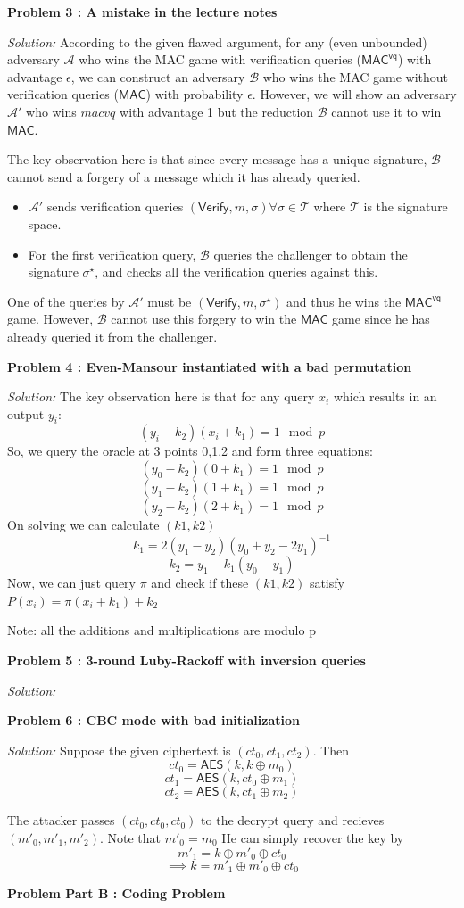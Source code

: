 \documentclass[a4paper, 11pt]{article}
\newenvironment{solution}
    {\textit{Solution:}}
    {\clearpage}
\newcommand{\prob}[1]{\begin{mdframed}[backgroundcolor=gray!20] \textbf{Problem #1}\end{mdframed}}
\newcommand{\verify}{\mathsf{Verify}}
\newcommand{\macvq}{\mathsf{MAC^{vq}}}
\newcommand{\mac}{\mathsf{MAC}}
\newcommand{\AES}{\mathsf{AES}}
\newcommand{\calA}{\mathcal{A}}
\newcommand{\calB}{\mathcal{B}}
\newcommand{\calT}{\mathcal{T}}
\begin{document}
\prob{3 : A mistake in the lecture notes}
\begin{solution}
    According to the given flawed argument, for any (even unbounded) adversary $\calA$ who wins the MAC game with verification queries ($\macvq$) with advantage $\epsilon$, we can construct an adversary $\calB$ who wins the MAC game without verification queries ($\mac$) with probability $\epsilon$. However, we will show an adversary $\calA'$ who wins  $macvq$ with advantage 1 but the reduction $\calB$ cannot use it to win $\mac$.

    The key observation here is that since every message has a unique signature, $\calB$ cannot send a forgery of a message which it has already queried. 
    \begin{itemize}
        \item $\calA'$ sends verification queries $(\verify , m, \sigma) \forall \sigma\in\calT$ where $\calT$ is the signature space.
        \item For the first verification query, $\calB$ queries the challenger to obtain the signature $\sigma^\star$, and checks all the verification queries against this.
    \end{itemize} 
    One of the queries by $\calA'$ must be $(\verify , m, \sigma^\star)$ and thus he wins the $\macvq$ game. However, $\calB$ cannot use this forgery to win the $\mac$ game since he has already queried it from the challenger.

\end{solution}


\prob{4 : Even-Mansour instantiated with a bad permutation}
\begin{solution}
   The key observation here is that for any query $x_i$ which results in an output $y_i$:
   $$(y_i-k_2)(x_i+k_1)=1 \mod p$$
   So, we query the oracle at 3 points 0,1,2 and form three equations:
   $$(y_0-k_2)(0+k_1)=1 \mod p$$
   $$(y_1-k_2)(1+k_1)=1 \mod p$$
   $$(y_2-k_2)(2+k_1)=1 \mod p$$
   On solving we can calculate $(k1,k2)$
   $$k_1=2(y_1-y_2)(y_0+y_2-2y_1)^{-1}$$
   $$k_2=y_1-k_1(y_0-y_1)$$
   Now, we can just query $\pi$ and check if these $(k1,k2)$ satisfy $P(x_i)=\pi(x_i+k_1)+k_2$
   
   Note: all the additions and multiplications are modulo p
\end{solution}


\prob{5 : 3-round Luby-Rackoff with inversion queries}
\begin{solution}
   
\end{solution}


\prob{6 : CBC mode with bad initialization}
\begin{solution}
   Suppose the given ciphertext is $(ct_0, ct_1, ct_2)$. Then 
   $$ct_0=\AES(k,k\oplus m_0)$$
   $$ct_1=\AES(k,ct_0\oplus m_1)$$
   $$ct_2=\AES(k,ct_1\oplus m_2)$$
   
   The attacker passes $(ct_0, ct_0, ct_0)$ to the decrypt query and recieves $(m'_0,m'_1,m'_2)$. Note that $m'_0=m_0$ He can simply recover the key by 
   $$m'_1=k\oplus m'_0\oplus ct_0$$
   $$\implies k=m'_1\oplus m'_0\oplus ct_0$$
\end{solution}


\prob{Part B : Coding Problem}
\end{document}
